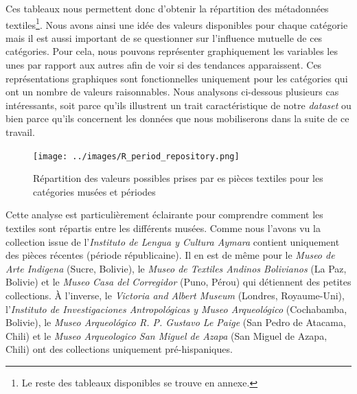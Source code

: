 Ces tableaux nous permettent donc d'obtenir la répartition des métadonnées textiles\footnote{Le reste des tableaux disponibles se trouve en annexe.}. Nous avons ainsi une idée des valeurs disponibles pour chaque catégorie mais il est aussi important de se questionner sur l'influence mutuelle de ces catégories. Pour cela, nous pouvons représenter graphiquement les variables les unes par rapport aux autres afin de voir si des tendances apparaissent. Ces représentations graphiques sont fonctionnelles uniquement pour les catégories qui ont un nombre de valeurs raisonnables. 
Nous analysons ci-dessous plusieurs cas intéressants, soit parce qu'ils illustrent un trait caractéristique de notre \textit{dataset} ou bien parce qu'ils concernent les données que nous mobiliserons dans la suite de ce travail.

 
 \begin{figure}[!h]
	\begin{center}
		\texttt{[image: ../images/R\_period\_repository.png]}
		\caption{Répartition des valeurs possibles prises par es pièces textiles pour les catégories musées et périodes}
		\label{fig:museum_period}
	 \end{center}
\end{figure}

Cette analyse est particulièrement éclairante pour comprendre comment les textiles sont répartis entre les différents musées.  Comme nous l'avons vu la collection issue de l'\textit{Instituto de Lengua y Cultura Aymara} contient uniquement des pièces récentes (période républicaine). Il en est de même pour le \textit{Museo de Arte Indigena} (Sucre, Bolivie), le \textit{Museo de Textiles Andinos Bolivianos} (La Paz, Bolivie) et le \textit{Museo Casa del Corregidor} (Puno, Pérou) qui détiennent des petites collections. À l'inverse, le \textit{Victoria and Albert Museum} (Londres, Royaume-Uni), l'\textit{Instituto de Investigaciones Antropológicas y Museo Arqueológico} (Cochabamba, Bolivie), le \textit{Museo Arqueológico R. P. Gustavo Le Paige} (San Pedro de Atacama, Chili) et le \textit{Museo Arqueologico San Miguel de Azapa} (San Miguel de Azapa, Chili) ont des collections uniquement pré-hispaniques.

